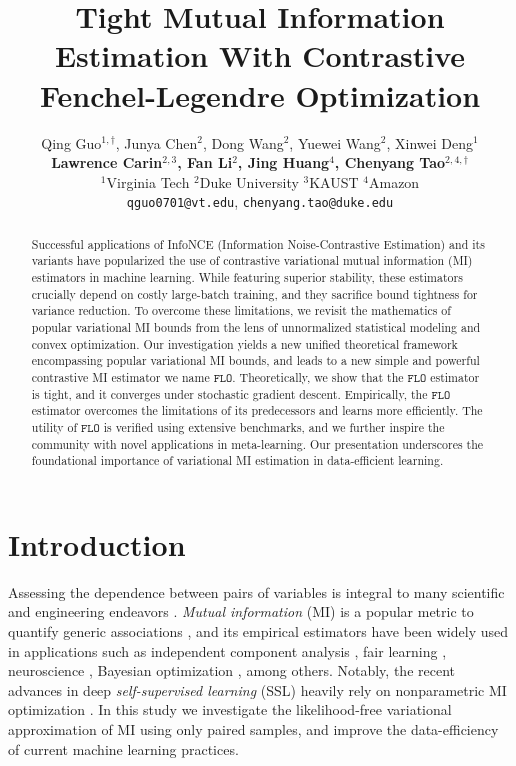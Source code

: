 \documentclass{article}
\title{Tight Mutual Information Estimation With Contrastive Fenchel-Legendre Optimization}
\author{%
	Qing Guo${}^{1,\dagger}$, Junya Chen${}^2$, Dong Wang${}^2$, Yuewei Wang${}^2$, Xinwei Deng${}^1$\\
	{\bf Lawrence Carin${}^{2,3}$, Fan Li${}^2$, Jing Huang${}^4$, Chenyang Tao${}^{2,4,\dagger}$} \\ ${}^1$Virginia Tech ${}^2$Duke University  ${}^3$KAUST ${}^4$Amazon \\
	\texttt {qguo0701@vt.edu},
	\texttt {chenyang.tao@duke.edu}
}
\theoremstyle{plain}
\theoremstyle{definition}
\theoremstyle{remark}
\newcommand{\FLO}{\texttt{FLO}}
\begin{document}
	
	
	\maketitle
	
	
	\begin{abstract}
		Successful applications of InfoNCE (Information Noise-Contrastive Estimation) and its variants have popularized the use of contrastive variational mutual information (MI) estimators in machine learning. While featuring superior stability, these estimators crucially depend on costly large-batch training, and they sacrifice bound tightness for variance reduction. To overcome these limitations, we revisit the mathematics of popular variational MI bounds from the lens of unnormalized statistical modeling and convex optimization. Our investigation yields a new unified theoretical framework encompassing popular variational MI bounds, and leads to a new simple and powerful contrastive MI estimator we name $\FLO$. Theoretically, we show that the $\FLO$ estimator is tight, and it converges under stochastic gradient descent. Empirically, the $\FLO$ estimator overcomes the limitations of its predecessors and learns more efficiently. The utility of $\FLO$ is verified using extensive benchmarks, and we further inspire the community with novel applications in meta-learning. Our presentation underscores the foundational importance of variational MI estimation in data-efficient learning. 
	\end{abstract}
	
	
	\vspace{-1.2em}
	\section{Introduction}
	\vspace{-5pt}
	
	Assessing the dependence between pairs of variables is integral to many scientific and engineering endeavors \citep{reshef2011detecting, shannon1948mathematical}. {\it Mutual information} (MI) is a popular metric to quantify generic associations \citep{mackay2003information}, and its empirical estimators have been widely used in applications such as independent component analysis \citep{bach2002kernel}, fair learning \citep{gupta2021controllable}, neuroscience \citep{palmer2015predictive}, Bayesian optimization \citep{kleinegesse2020bayesian}, among others. Notably, the recent advances in deep {\it self-supervised learning} (SSL) heavily rely on nonparametric MI optimization  \citep{tishby2015deep, oord2018representation, he2020momentum, chen2020simple, grill2020bootstrap}. 
	In this study we investigate the likelihood-free variational approximation of MI using only paired samples, and improve the data-efficiency of current machine learning practices. 
	
\end{document}

